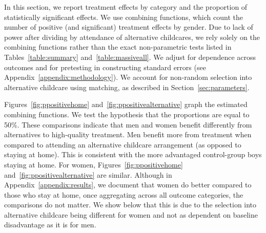 In this section, we report treatment effects by category and the proportion of statistically significant effects. We use combining functions, which count the number of positive (and significant) treatment effects by gender. Due to lack of power after dividing by attendance of alternative childcares, we rely solely on the combining functions rather than the exact non-parametric tests listed in Tables~\ref{table:summary} and~\ref{table:massiveall}. We adjust for dependence across outcomes and for pretesting in constructing standard errors (see Appendix~\ref{appendix:methodology}). We account for non-random selection into alternative childcare using matching, as described in Section~\ref{sec:parameters}.

Figures~\ref{fig:ppositivehome} and~\ref{fig:ppositivealternative} graph the estimated combining functions. We test the hypothesis that the proportions are equal to 50\%. These comparisons indicate that men and women benefit differently from alternatives to high-quality treatment. Men benefit more from treatment when compared to attending an alternative childcare arrangement (as opposed to staying at home). This is consistent with the more advantaged control-group boys staying at home. For women, Figures~\ref{fig:ppositivehome} and~\ref{fig:ppositivealternative} are similar. Although in Appendix~\ref{appendix:results}, we document that women do better compared to those who stay at home, once aggregating across all outcome categories, the comparisons do not matter. We show below that this is due to the selection into alternative childcare being different for women and not as dependent on baseline disadvantage as it is for men.

